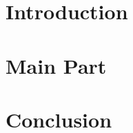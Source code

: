 \documentclass{report}
\begin{document}
\makenewtitlepage

\tableofcontents
\newpage

\begin{abstract}
    
\end{abstract}

\section{Introduction}
    


\section{Main Part}
    


\section{Conclusion}
    



\end{document}
